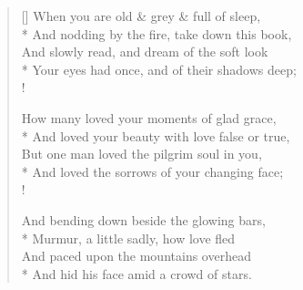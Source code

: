 \documentclass[MAIN]{subfiles}
\begin{document}
\settowidth{\versewidth}{When you are old \& grey \& full of sleep,}
\begin{verse}[\versewidth]
When you are old \& grey \& full of sleep,\\*
\vin And nodding by the fire, take down this book,\\
\vin And slowly read, and dream of the soft look\\*
Your eyes had once, and of their shadows deep;\\!

How many loved your moments of glad grace,\\*
\vin And loved your beauty with love false or true,\\
\vin But one man loved the pilgrim soul in you,\\*
And loved the sorrows of your changing face;\\!

And bending down beside the glowing bars,\\*
\vin Murmur, a little sadly, how love fled\\
\vin And paced upon the mountains overhead\\*
And hid his face amid a crowd of stars.
\end{verse}
\end{document}
